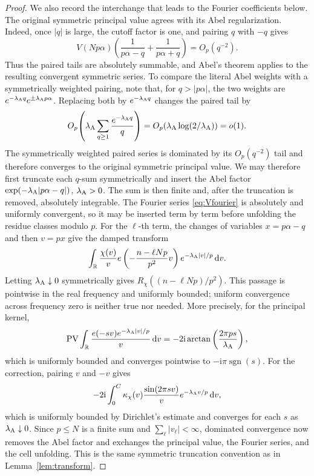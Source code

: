 \documentclass[11pt]{article}
\numberwithin{equation}{section}
\theoremstyle{definition}
\newcommand{\R}{\mathbb R}
\newcommand{\1}{\mathbf 1}
\newcommand{\ii}{\mathrm i}
\newcommand{\dd}{\,\mathrm d}
\newcommand{\PV}{\operatorname{PV}}
\newcommand{\sgn}{\operatorname{sgn}}
\begin{document}
\begin{proof}
We also record the interchange that leads to the Fourier coefficients
below.  The original symmetric principal value agrees with its Abel
regularization.  Indeed, once \(|q|\) is large, the cutoff factor is
one, and pairing \(q\) with \(-q\) gives
\[
 V(Np\alpha)
 \left(\frac1{p\alpha-q}+\frac1{p\alpha+q}\right)
 =O_p(q^{-2}).
\]
Thus the paired tails are absolutely summable, and Abel's theorem
applies to the resulting convergent symmetric series.  To compare the
literal Abel weights with a symmetrically weighted pairing, note that,
for \(q>|p\alpha|\), the two weights are
\(e^{-\lambda_{\rm A}q}e^{\pm\lambda_{\rm A}p\alpha}\).  Replacing both
by \(e^{-\lambda_{\rm A}q}\) changes the paired tail by
\[
 O_p\!\left(
 \lambda_{\rm A}\sum_{q\ge1}\frac{e^{-\lambda_{\rm A}q}}q
 \right)
 =O_p\!\left(\lambda_{\rm A}\log(2/\lambda_{\rm A})\right)=o(1).
\]
The symmetrically weighted paired series is dominated by its
\(O_p(q^{-2})\) tail and therefore converges to the original symmetric
principal value.  We may therefore
first truncate each \(q\)-sum symmetrically and insert the Abel factor
\(\exp(-\lambda_{\rm A}|p\alpha-q|)\), \(\lambda_{\rm A}>0\).  The sum is then finite and,
after the truncation is removed, absolutely integrable.  The Fourier
series \eqref{eq:Vfourier} is absolutely and uniformly convergent, so
it may be inserted term by term before unfolding the residue classes
modulo \(p\).  For the \(\ell\)-th term, the changes of variables
\(x=p\alpha-q\) and then \(v=px\) give the damped transform
\[
 \int_{\R}\frac{\chi(v)}v
 e\left(-\frac{n-\ell Np}{p^2}v\right)
 e^{-\lambda_{\rm A}|v|/p}\dd v.
\]
Letting \(\lambda_{\rm A}\downarrow0\) symmetrically gives
\(R_\chi((n-\ell Np)/p^2)\).  This passage is pointwise in the real
frequency and uniformly bounded; uniform convergence across frequency
zero is neither true nor needed.  More precisely, for the principal
kernel,
\[
 \PV\int_{\R}\frac{e(-sv)e^{-\lambda_{\rm A}|v|/p}}v\dd v
 =-2\ii\arctan\left(\frac{2\pi ps}{\lambda_{\rm A}}\right),
\]
which is uniformly bounded and converges pointwise to
\(-\ii\pi\sgn(s)\).  For the correction, pairing \(v\) and \(-v\) gives
\[
 -2\ii\int_0^C\kappa_\chi(v)
       \frac{\sin(2\pi sv)}v e^{-\lambda_{\rm A}v/p}\dd v,
\]
which is uniformly bounded by Dirichlet's estimate and converges for
each \(s\) as \(\lambda_{\rm A}\downarrow0\).  Since \(p\le N\) is a finite sum and
\(\sum_\ell|v_\ell|<\infty\), dominated convergence now removes the
Abel factor and exchanges the principal value, the Fourier series, and
the cell unfolding.  This is the same symmetric truncation convention
as in Lemma~\ref{lem:transform}.


\end{proof}
\end{document}
